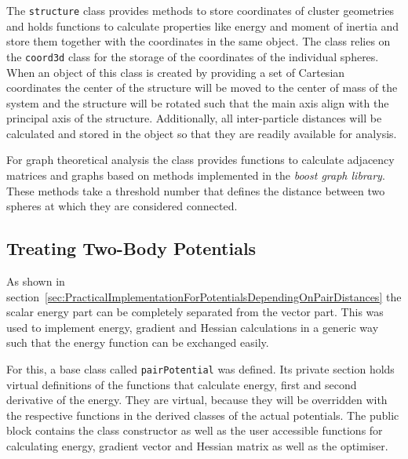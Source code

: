 The \verb|structure| class provides methods to store coordinates of cluster
geometries and holds functions to calculate properties like energy and moment
of inertia and store them together with the coordinates in the same object. The
class relies on the \verb|coord3d| class for the storage of the coordinates of
the individual spheres.  When an object of this class is created by providing a
set of Cartesian coordinates the center of the structure will be moved to the
center of mass of the system and the structure will be rotated such that the
main axis align with the principal axis of the structure. Additionally, all
inter-particle distances will be calculated and stored in the object so that
they are readily available for analysis.

For graph theoretical analysis the class provides functions to calculate
adjacency matrices and graphs based on methods implemented in the \textit{boost
graph library}\autocite{Siek_BoostGraphLibrary_2002}. These methods take a threshold number
that defines the distance between two spheres at which they are considered
connected.

\subsection{Treating Two-Body Potentials}
\label{sec:thepairpotentialclass}

As shown in
section~\ref{sec:PracticalImplementationForPotentialsDependingOnPairDistances}
the scalar energy part can be completely separated from the vector part. This
was used to implement energy, gradient and Hessian calculations in a generic
way such that the energy function can be exchanged easily. 

For this, a base class called \verb|pairPotential| was defined. Its private
section holds virtual definitions of the functions that calculate energy, first
and second derivative of the energy. They are virtual, because they will be
overridden with the respective functions in the derived classes of the actual
potentials. The public block contains the class constructor as well as the user
accessible functions for calculating energy, gradient vector and Hessian matrix
as well as the optimiser.

